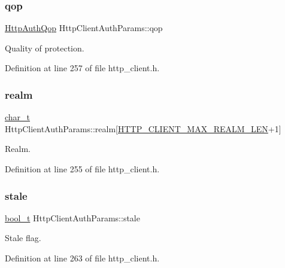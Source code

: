 \subsubsection{\texorpdfstring{qop}{qop}}
{\footnotesize\ttfamily \hyperlink{http__common_8h_add2473701f02b0e633970b91bebf92b0}{Http\+Auth\+Qop} Http\+Client\+Auth\+Params\+::qop}



Quality of protection. 



Definition at line 257 of file http\+\_\+client.\+h.

\mbox{\label{structHttpClientAuthParams_a23f1e898b935e02ab807b69e557cb8fa}} 
\subsubsection{\texorpdfstring{realm}{realm}}
{\footnotesize\ttfamily \hyperlink{compiler__port_8h_a40bb5262bf908c328fbcfbe5d29d0201}{char\+\_\+t} Http\+Client\+Auth\+Params\+::realm\mbox{[}\hyperlink{http__client_8h_afd0c1d75944d4aaff63ae2e8b2513072}{H\+T\+T\+P\+\_\+\+C\+L\+I\+E\+N\+T\+\_\+\+M\+A\+X\+\_\+\+R\+E\+A\+L\+M\+\_\+\+L\+EN}+1\mbox{]}}



Realm. 



Definition at line 255 of file http\+\_\+client.\+h.

\mbox{\label{structHttpClientAuthParams_ae97b6746ab9fbdf4b0cd90e354c75ca8}} 
\subsubsection{\texorpdfstring{stale}{stale}}
{\footnotesize\ttfamily \hyperlink{compiler__port_8h_a812d16e5494522586b3784e55d479912}{bool\+\_\+t} Http\+Client\+Auth\+Params\+::stale}



Stale flag. 



Definition at line 263 of file http\+\_\+client.\+h.

